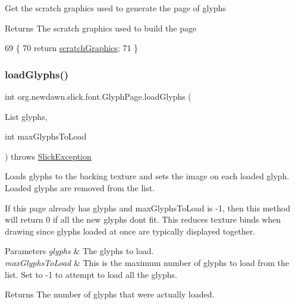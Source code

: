 Get the scratch graphics used to generate the page of glyphs

\begin{DoxyReturn}{Returns}
The scratch graphics used to build the page 
\end{DoxyReturn}

\begin{DoxyCode}
69                                                   \{
70         \textcolor{keywordflow}{return} \mbox{\hyperlink{classorg_1_1newdawn_1_1slick_1_1font_1_1_glyph_page_a493fd684bdaaf07f0e15d00e4e173391}{scratchGraphics}};
71     \}
\end{DoxyCode}
\mbox{\label{classorg_1_1newdawn_1_1slick_1_1font_1_1_glyph_page_a2123a4715446781b1baae6f8a4c7d811}} 
\subsubsection{\texorpdfstring{load\+Glyphs()}{loadGlyphs()}}
{\footnotesize\ttfamily int org.\+newdawn.\+slick.\+font.\+Glyph\+Page.\+load\+Glyphs (\begin{DoxyParamCaption}\item[{List}]{glyphs,  }\item[{int}]{max\+Glyphs\+To\+Load }\end{DoxyParamCaption}) throws \mbox{\hyperlink{classorg_1_1newdawn_1_1slick_1_1_slick_exception}{Slick\+Exception}}\hspace{0.3cm}{\ttfamily [inline]}}

Loads glyphs to the backing texture and sets the image on each loaded glyph. Loaded glyphs are removed from the list.

If this page already has glyphs and max\+Glyphs\+To\+Load is -\/1, then this method will return 0 if all the new glyphs don\textquotesingle{}t fit. This reduces texture binds when drawing since glyphs loaded at once are typically displayed together. 
\begin{DoxyParams}{Parameters}
{\em glyphs} & The glyphs to load. \\
\hline
{\em max\+Glyphs\+To\+Load} & This is the maximum number of glyphs to load from the list. Set to -\/1 to attempt to load all the glyphs. \\
\hline
\end{DoxyParams}
\begin{DoxyReturn}{Returns}
The number of glyphs that were actually loaded. 
\end{DoxyReturn}

